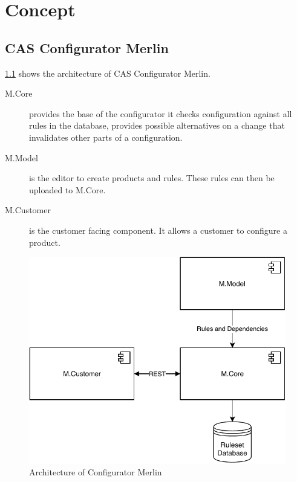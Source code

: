 \chapter{Concept}
\label{ch:Concept}

\section{CAS Configurator Merlin}
\label{sec:Concept:ConfiguratorMerlin}

\ref{fig:Concept:ConfiguratorMerlin} shows the architecture of CAS Configurator Merlin.
\begin{description}
    \item[M.Core] provides the base of the configurator it checks configuration against all rules in the database, provides possible alternatives on a change that invalidates other parts of a configuration.
    \item[M.Model] is the editor to create products and rules. These rules can then be uploaded to M.Core.
    \item[M.Customer] is the customer facing component. It allows a customer to configure a product.
\end{description}

\begin{figure}
    \centering
    \includegraphics{./figures/MerlinConfigurator.pdf}
    \caption{Architecture of Configurator Merlin \cite[Fig. 4.1]{raabKollaborativeProduktkonfigurationEchtzeit2019}}
    \label{fig:Concept:ConfiguratorMerlin}
\end{figure}

